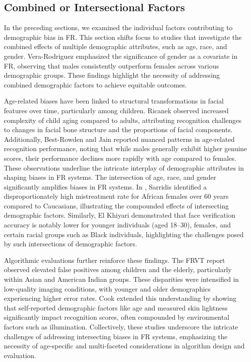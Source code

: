 
\subsection{Combined or Intersectional Factors}

In the preceding sections, we examined the individual factors contributing to
demographic bias in FR. This section shifts focus to studies that investigate
the combined effects of multiple demographic attributes, such as age, race, and
gender. Vera-Rodriguez \etal \cite{vera2019facegenderid} emphasized the
significance of gender as a covariate in FR, observing that males consistently
outperform females across various demographic groups. These findings highlight
the necessity of addressing combined demographic factors to achieve equitable
outcomes.

Age-related biases have been linked to structural transformations in facial
features over time, particularly among children. Ricanek \etal
\cite{ricanek2015review} observed increased complexity of child aging compared
to adults, attributing recognition challenges to changes in facial bone
structure and the proportions of facial components. Additionally, Best-Rowden
and Jain \cite{best2017longitudinal} reported nuanced patterns in age-related
recognition performance, noting that while males generally exhibit higher
genuine scores, their performance declines more rapidly with age compared to
females. These observations underline the intricate interplay of demographic
attributes in shaping biases in FR systems. The intersection of age, race, and
gender significantly amplifies biases in FR systems. In
\cite{sarridis2023towards}, Sarridis \etal identified a disproportionately high
mistreatment rate for African females over 60 years compared to Caucasians,
illustrating the compounded effects of intersecting demographic factors.
Similarly, El Khiyari \etal \cite{el2016face} demonstrated that face
verification accuracy is notably lower for younger individuals (aged 18--30),
females, and certain racial groups such as Black individuals, highlighting the
challenges posed by such intersections of demographic factors. 

Algorithmic evaluations further reinforce these findings. The FRVT report
\cite{frvt3} observed elevated false positives among children and the elderly,
particularly within Asian and American Indian groups. These disparities were
intensified in low-quality imaging conditions, with younger and older
demographics experiencing higher error rates. Cook \etal
\cite{cook2023demographic} extended this understanding by showing that
self-reported demographic factors like age and measured skin lightness
significantly impact recognition scores, often compounded by environmental
factors such as illumination. Collectively, these studies underscore the
intricate challenges of addressing intersecting biases in FR systems,
emphasizing the necessity of age-specific and multi-faceted considerations in
algorithm design and evaluation.


